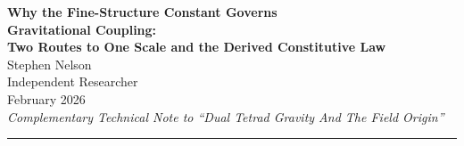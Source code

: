 \documentclass[11pt]{article}
\begin{document}
\begin{center}
{\Large\bfseries Why the Fine-Structure Constant Governs\\[4pt] Gravitational Coupling:\\[4pt] Two Routes to One Scale and the Derived Constitutive Law}\\[12pt]
{\normalsize Stephen Nelson}\\
{\small Independent Researcher}\\[8pt]
{\small February 2026}\\[6pt]
{\small\itshape Complementary Technical Note to ``Dual Tetrad Gravity And The Field Origin''}
\end{center}

\vspace{0.5cm}
\hrule
\vspace{0.5cm}
\end{document}
